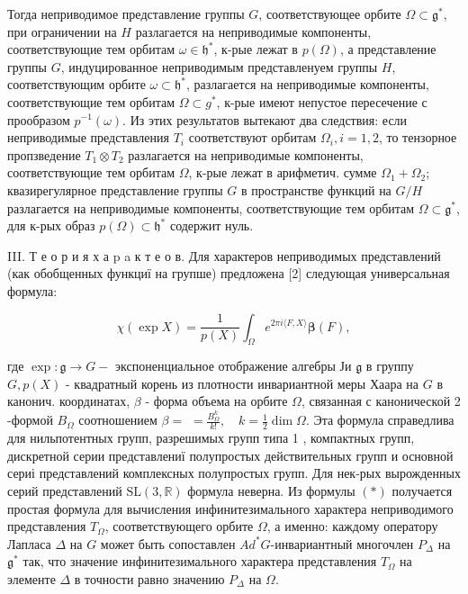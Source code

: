 \documentclass[10pt]{article}
\begin{document}
Тогда неприводимое представление группы $G$, соответствующее орбите $\Omega \subset \mathfrak{g}^{*}$, при ограничении на $H$ разлагается на неприводимые компоненты, соответствующие тем орбитам $\omega \in \mathfrak{h}^{*}$, к-рые лежат в $p(\Omega)$, а представление группы $G$, индуцированное неприводимым представленуем группы $H$, соответствующим орбите $\omega \subset \mathfrak{h}^{*}$, разлагается на неприводимые компоненты, соответствующие тем орбитам $\Omega \subset g^{*}$, к-рые имеют непустое пересечение с прообразом $p^{-1}(\omega)$. Из этих результатов вытекают два следствия: если неприводимые представления $T_{i}$ соответствуют орбитам $\Omega_{i}, i=1,2$, то тензорное пропзведение $T_{1} \otimes T_{2}$ разлагается на неприводимые компоненты, соответствующие тем орбитам $\Omega$, к-рые лежат в арифметич. сумме $\Omega_{1}+\Omega_{2}$; квазирегулярное представление группы $G$ в пространстве функций на $G / H$ разлагается на неприводимые компоненты, соответствующие тем орбитам $\Omega \subset \mathfrak{g}^{*}$, для к-рых образ $p(\Omega) \subset \mathfrak{h}^{*}$ содержит нуль.

III. Т е о р и я х а p a к т е о в. Для характеров неприводимых представлений (как обобщенных функциї на групше) предложена [2] следующая универсальная формула:

\[
\chi(\exp X)=\frac{1}{p(X)} \int_{\Omega} e^{2 \pi i\langle F, X\rangle} \boldsymbol{\beta}(F),
\]

где $\exp : \mathfrak{g} \rightarrow G-$ экспоненциальное отображение алгебры Ји $\mathfrak{g}$ в группу $G, p(X)$ - квадратный корень из плотности инвариантной меры Хаара на $G$ в канонич. координатах, $\beta$ - форма объема на орбите $\Omega$, связанная с канонической 2 -формой $B_{\Omega}$ соотношением $\beta=$ $=\frac{B_{\Omega}^{k}}{k !}, \quad k=\frac{1}{2} \operatorname{dim} \Omega$. Эта формула справедлива для нильпотентных групп, разрешимых групп типа 1 , компактных групп, дискретной серии представлениї полупростых действительных групп и основной сериі представлений комплексных полупростых групп. Для нек-рых вырожденных серий представлений $\mathrm{SL}(3, \mathbb{R})$ формула неверна. Из формулы $(*)$ получается простая формула для вычисления инфинитезимального характера неприводимого представления $T_{\Omega}$, соответствующего орбите $\Omega$, а именно: каждому оператору Лапласа $\Delta$ на $G$ может быть сопоставлен $A d^{*} G$-инвариантный многочлен $P_{\Delta}$ на $\mathfrak{g}^{*}$ так, что значение инфинитезимального характера представления $T_{\Omega}$ на элементе $\Delta$ в точности равно значению $P_{\Delta}$ на $\Omega$.
\end{document}
